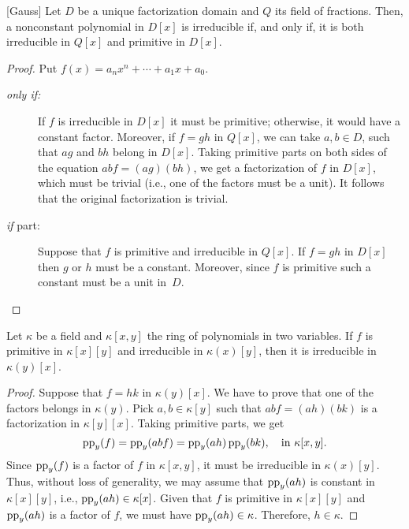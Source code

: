 \begin{lem}\label{lem:gauss-irreducibility}{\rm[Gauss]}
    Let\/ $D$ be a unique factorization domain and\/ $Q$ its field of fractions. Then, a nonconstant polynomial in\/ $D[x]$ is irreducible if, and only if, it is both irreducible in\/ $Q[x]$ and primitive in\/ $D[x]$.
\end{lem}

\begin{proof}
    Put $f(x) = a_nx^n+\cdots+a_1x+a_0$.
    
    \begin{description}
        \item[\rm\it only if:] If $f$ is irreducible in $D[x]$ it must be primitive; otherwise, it would have a constant factor. Moreover, if $f=gh$ in $Q[x]$, we can take $a,b\in D$, such that $ag$ and $bh$ belong in $D[x]$. Taking primitive parts on both sides of the equation $abf=(ag)(bh)$, we get a factorization of $f$ in $D[x]$, which must be trivial (i.e., one of the factors must be a unit). It follows that the original factorization is trivial.

        \item[\rm{\it if\/} part:] Suppose that $f$ is primitive and irreducible in $Q[x]$. If $f=gh$ in $D[x]$ then $g$ or $h$ must be a constant. Moreover, since $f$ is primitive such a constant must be a unit in~$D$.
    \end{description}
\end{proof}

\begin{prop}\label{prop:primitive+irreducible=irreducible}
    Let\/ $\kappa$ be a field and\/ $\kappa[x,y]$ the ring of polynomials in two variables. If\/ $f$ is primitive in\/ $\kappa[x][y]$ and irreducible in\/ $\kappa(x)[y]$, then it is irreducible in\/ $\kappa(y)[x]$.
\end{prop}

\begin{proof}
    Suppose that $f=hk$ in $\kappa(y)[x]$. We have to prove that one of the factors belongs in $\kappa(y)$. Pick $a,b\in\kappa[y]$ such that $abf=(ah)(bk)$ is a factorization in $\kappa[y][x]$. Taking primitive parts, we get 
    $$
        \operatorname{pp}_y(f)=\operatorname{pp}_y(abf)
            =\operatorname{pp}_y(ah)\operatorname{pp}_y(bk),\quad\text{in }\kappa[x,y].
    $$
    Since $\operatorname{pp}_y(f)$ is a factor of $f$ in $\kappa[x,y]$, it must be irreducible in $\kappa(x)[y]$. Thus, without loss of generality, we may assume that $\operatorname{pp}_y(ah)$ is constant in $\kappa[x][y]$, i.e., $\operatorname{pp}_y(ah)\in\kappa[x]$. Given that $f$ is primitive in $\kappa[x][y]$ and $\operatorname{pp}_y(ah)$ is a factor of $f$, we must have $\operatorname{pp}_y(ah)\in\kappa$. Therefore, $h\in\kappa$.
\end{proof}

